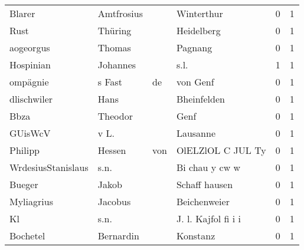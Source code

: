 \documentclass[10pt,a4paper,landscape]{article}
\begin{document}
\begin{longtable}{llllrr}
                   Blarer &                         Amtfrosius &             &                                  Winterthur &          0 &         1 \\
                     Rust &                            Thüring &             &                                  Heidelberg &          0 &         1 \\
                aogeorgus &                             Thomas &             &                                     Pagnang &          0 &         1 \\
                Hospinian &                           Johannes &             &                                        s.l. &          1 &         1 \\
                 ompägnie &                             s Fast &          de &                                    von Genf &          0 &         1 \\
              dlischwiler &                               Hans &             &                                 Bheinfelden &          0 &         1 \\
                     Bbza &                            Theodor &             &                                        Genf &          0 &         1 \\
                  GUisWcV &                               v L. &             &                                    Lausanne &          0 &         1 \\
                  Philipp &                             Hessen &         von &                           OlELZlOL C JUL Ty &          0 &         1 \\
       WrdesiusStanislaus &                               s.n. &             &                              Bi chau y cw w &          0 &         1 \\
                   Bueger &                              Jakob &             &                               Schaff hausen &          0 &         1 \\
               Myliagrius &                            Jacobus &             &                                Beichenweier &          0 &         1 \\
                       Kl &                               s.n. &             &                         J. l. Kajfol fi i i &          0 &         1 \\
                 Bochetel &                          Bernardin &             &                                    Konstanz &          0 &         1 \\

\end{longtable}
\end{document}
